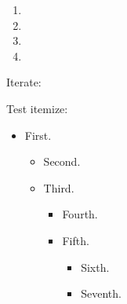 \documentclass{article}
\begin{document}
\begin{enumerate}
\item {}

\item {}

\item {}

\item {}
\end{enumerate}

Iterate:
\begin{enumerate}
\foreachproblem{\item \thisproblem}
\end{enumerate}

Test itemize:
\begin{itemize}
\item First.
 \begin{itemize}
  \item Second.
  \item Third.
  \begin{itemize}
   \item Fourth.
   \item Fifth.
    \begin{itemize}
     \item Sixth.
     \item Seventh.
    \end{itemize}
  \end{itemize}
 \end{itemize}
\end{itemize}
\end{document}
